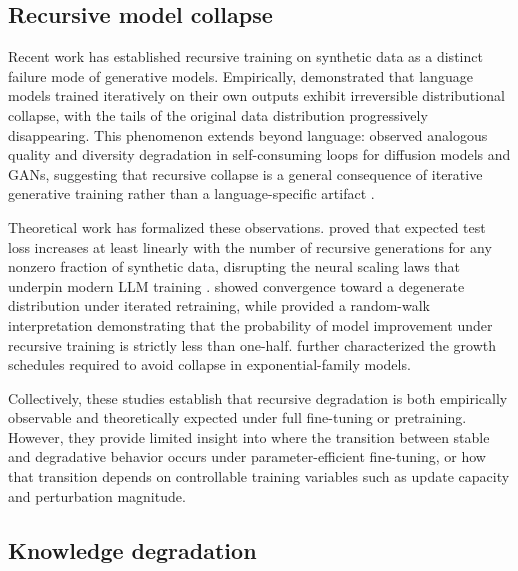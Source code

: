\documentclass[a4paper,fleqn]{cas-dc}
\begin{document}
\subsection{Recursive model collapse}

Recent work has established recursive training on synthetic data as a distinct
failure mode of generative models. Empirically, \citet{shumailov2024}
demonstrated that language models trained iteratively on their own outputs
exhibit irreversible distributional collapse, with the tails of the original
data distribution progressively disappearing. This phenomenon extends beyond
language: \citet{alemohammad2024} observed analogous quality and diversity
degradation in self-consuming loops for diffusion models and GANs, suggesting
that recursive collapse is a general consequence of iterative generative
training rather than a language-specific artifact \citep{guo2024collapse}.

Theoretical work has formalized these observations. \citet{dohmatob2025}
proved that expected test loss increases at least linearly with the number of
recursive generations for any nonzero fraction of synthetic data, disrupting
the neural scaling laws that underpin modern LLM training
\citep{kaplan2020scaling,dohmatob2024scaling}.
\citet{seddik2024} showed convergence toward a degenerate distribution under
iterated retraining, while \citet{xu2025} provided a random-walk interpretation
demonstrating that the probability of model improvement under recursive training
is strictly less than one-half. \citet{dey2024} further characterized the
growth schedules required to avoid collapse in exponential-family models.

Collectively, these studies establish that recursive degradation is both
empirically observable and theoretically expected under full fine-tuning or
pretraining. However, they provide limited insight into where the transition
between stable and degradative behavior occurs under parameter-efficient
fine-tuning, or how that transition depends on controllable training variables
such as update capacity and perturbation magnitude.

\subsection{Knowledge degradation}
\end{document}
